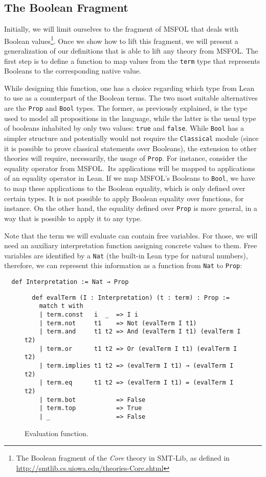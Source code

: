 \subsection{The Boolean Fragment}

Initially, we will limit ourselves to the fragment of MSFOL that
deals with Boolean values\footnote{The Boolean fragment of the
\emph{Core} theory in SMT-Lib, as defined in
\url{http://smtlib.cs.uiowa.edu/theories-Core.shtml}}. Once
we show how to lift this fragment, we will present a generalization
of our definitions that is able to lift any theory from MSFOL.
%
The first step is to define a function to map values from the \texttt{term} type
that represents Booleans to the corresponding native value.

While designing this function, one has a
choice regarding which type from Lean to use as a counterpart of the Boolean terms. The two
most suitable alternatives are the \texttt{Prop} and \texttt{Bool} types. The former, as
previously explained, is the type used to model all propositions in the language, while
the latter is the usual type of booleans inhabited by only two values: \texttt{true} and
\texttt{false}. While \texttt{Bool} has a simpler structure and potentially would not
require the \texttt{Classical} module (since it is possible to prove classical statements over Booleans),
the extension to other theories will require, necessarily, the usage of \texttt{Prop}. For instance,
consider the equality operator from MSFOL.\ Its applications will be mapped to applications of an equality operator
in Lean. If we map MSFOL's Booleans to \texttt{Bool}, we have to map these applications to the
Boolean equality, which is only defined over certain types. It is not possible
to apply Boolean equality over functions, for instance. On the other hand, the equality
defined over \texttt{Prop} is more general, in a way that is possible to apply it to any type.

Note that the term we will evaluate can contain free variables. For those, we will need an auxiliary interpretation function assigning concrete values to them.
Free variables are
identified by a \texttt{Nat} (the built-in Lean type for natural numbers), therefore, we can
represent this information as a function from \texttt{Nat} to
\texttt{Prop}:

\begin{verbatim}
  def Interpretation := Nat → Prop
\end{verbatim}


\begin{figure}[t]
\begin{verbatim}
  def evalTerm (I : Interpretation) (t : term) : Prop :=
    match t with
    | term.const   i  _  => I i
    | term.not     t1    => Not (evalTerm I t1)
    | term.and     t1 t2 => And (evalTerm I t1) (evalTerm I t2)
    | term.or      t1 t2 => Or (evalTerm I t1) (evalTerm I t2)
    | term.implies t1 t2 => (evalTerm I t1) → (evalTerm I t2)
    | term.eq      t1 t2 => (evalTerm I t1) = (evalTerm I t2)
    | term.bot           => False
    | term.top           => True
    | _                  => False
\end{verbatim}
\caption{Evaluation function.}\label{evalTerm1}
\end{figure}


